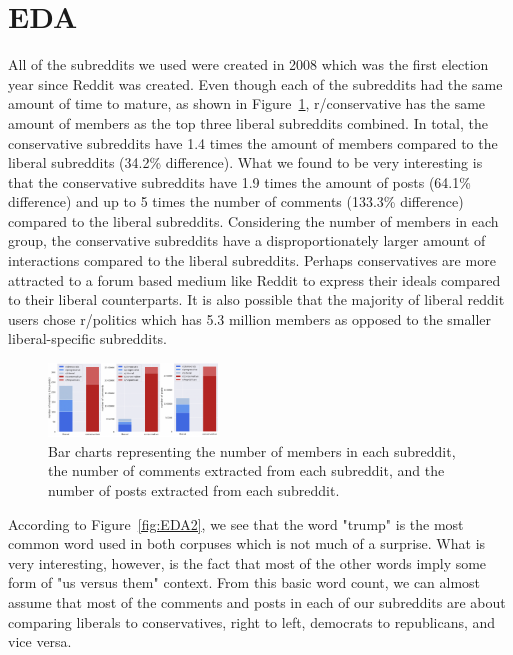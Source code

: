 \documentclass[conference]{IEEEtran}
\begin{document}
\section{EDA}
All of the subreddits we used were created in 2008 which was the first election year since Reddit was created. Even though each of the subreddits had the same amount of time to mature, as shown in Figure~\ref{fig:EDA1}, r/conservative has the same amount of members as the top three liberal subreddits combined. In total, the conservative subreddits have 1.4 times the amount of members compared to the liberal subreddits (34.2\% difference). What we found to be very interesting is that the conservative subreddits have 1.9 times the amount of posts (64.1\% difference) and up to 5 times the number of comments (133.3\% difference) compared to the liberal subreddits. Considering the number of members in each group, the conservative subreddits have a disproportionately larger amount of interactions compared to the liberal subreddits. Perhaps conservatives are more attracted to a forum based medium like Reddit to express their ideals compared to their liberal counterparts. It is also possible that the majority of liberal reddit users chose r/politics which has 5.3 million members as opposed to the smaller liberal-specific subreddits.

\begin{figure}[tb]
    \centering
    \includegraphics[width=0.4\textwidth]{EDA1.pdf}
    \vspace{-2mm}
    \caption{Bar charts representing the number of members in each subreddit, the number of comments extracted from each subreddit, and the number of posts extracted from each subreddit.}
    \label{fig:EDA1}
    \vspace{-5mm}
\end{figure}

According to Figure~\ref{fig:EDA2}, we see that the word "trump" is the most common word used in both corpuses which is not much of a surprise. What is very interesting, however, is the fact that most of the other words imply some form of "us versus them" context. From this basic word count, we can almost assume that most of the comments and posts in each of our subreddits are about comparing liberals to conservatives, right to left, democrats to republicans, and vice versa. 
\end{document}

